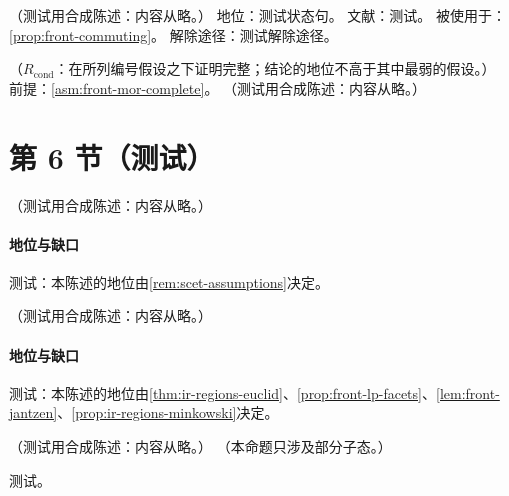 \begin{assumption}\label{asm:front-mor-complete}
（测试用合成陈述：内容从略。）
地位：测试状态句。
文献：测试。
被使用于：\cref{prop:front-commuting}。
解除途径：测试解除途径。
\end{assumption}

\begin{proposition}\label{prop:front-commuting}
（$R_{\mathrm{cond}}$：在所列编号假设之下证明完整；结论的地位不高于其中最弱的假设。）
前提：\cref{asm:front-mor-complete}。
（测试用合成陈述：内容从略。）
\end{proposition}

\section{第 6 节（测试）}\label{sec:front-sll}

\begin{proposition}["区域 = Newton 多面体的下表面"在 Minkowski 运动学中不成立 \tagV]\label{prop:front-hidden-regions}
（测试用合成陈述：内容从略。）
\end{proposition}
\paragraph{地位与缺口}测试：本陈述的地位由\cref{rem:scet-assumptions}决定。

\begin{conjecture}\label{conj:front-mor-minkowski}
（测试用合成陈述：内容从略。）
\end{conjecture}
\paragraph{地位与缺口}测试：本陈述的地位由\cref{thm:ir-regions-euclid}、\cref{prop:front-lp-facets}、\cref{lem:front-jantzen}、\cref{prop:ir-regions-minkowski}决定。

\begin{proposition}\label{prop:front-glauber-bfkl}
（测试用合成陈述：内容从略。）
（本命题只涉及部分子态。）
\end{proposition}
\begin{proofsketch}测试。\end{proofsketch}
